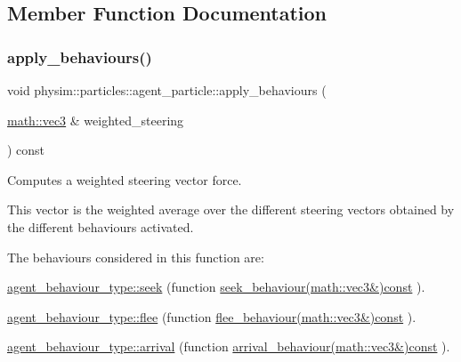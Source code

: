 \subsection{Member Function Documentation}
\mbox{\label{classphysim_1_1particles_1_1agent__particle_a8c43ad56e0b73e6795a287fb945da092}} 
\subsubsection{\texorpdfstring{apply\+\_\+behaviours()}{apply\_behaviours()}\hspace{0.1cm}{\footnotesize\ttfamily [1/3]}}
{\footnotesize\ttfamily void physim\+::particles\+::agent\+\_\+particle\+::apply\+\_\+behaviours (\begin{DoxyParamCaption}\item[{\hyperlink{structphysim_1_1math_1_1vec3}{math\+::vec3} \&}]{weighted\+\_\+steering }\end{DoxyParamCaption}) const}



Computes a weighted steering vector force. 

This vector is the weighted average over the different steering vectors obtained by the different behaviours activated.

The behaviours considered in this function are\+:
\begin{DoxyItemize}
\item \hyperlink{namespacephysim_1_1particles_a033757595f7862a0fc8a389d79bf9c88ae6f6362248805a36c61d205dbc6f4076}{agent\+\_\+behaviour\+\_\+type\+::seek} (function \hyperlink{classphysim_1_1particles_1_1agent__particle_ac4eabcfb94d1c5769415f8822556be8b}{seek\+\_\+behaviour(math\+::vec3\&)const} ).
\item \hyperlink{namespacephysim_1_1particles_a033757595f7862a0fc8a389d79bf9c88a918634f9410d3be95b2c6074f18cc62b}{agent\+\_\+behaviour\+\_\+type\+::flee} (function \hyperlink{classphysim_1_1particles_1_1agent__particle_aca72133a2c84d5849185cbe8daf8910f}{flee\+\_\+behaviour(math\+::vec3\&)const} ).
\item \hyperlink{namespacephysim_1_1particles_a033757595f7862a0fc8a389d79bf9c88a0d4144ffc7e8e66a72800ea2b4101fd0}{agent\+\_\+behaviour\+\_\+type\+::arrival} (function \hyperlink{classphysim_1_1particles_1_1agent__particle_a2859f442bcd33d39767e15d882ba5229}{arrival\+\_\+behaviour(math\+::vec3\&)const} ).
\end{DoxyItemize}

